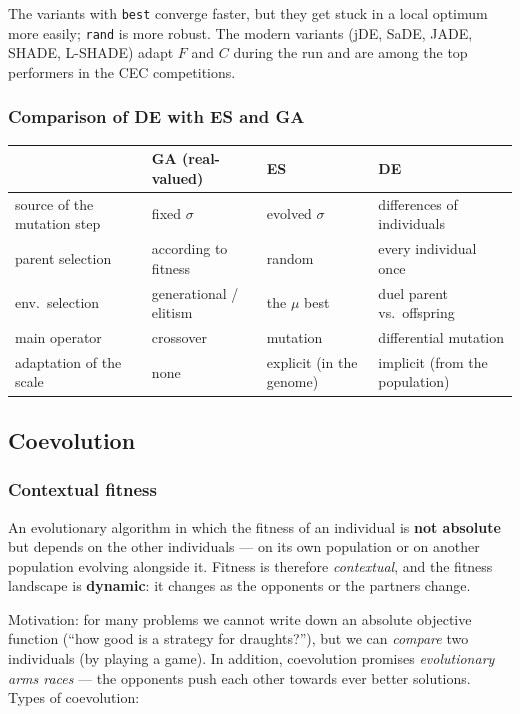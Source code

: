 \documentclass[11pt,a4paper]{article}
\theoremstyle{definition}
\providecommand{\uv}[1]{``#1''}
\begin{document}
The variants with \texttt{best} converge faster, but they get stuck in a local
optimum more easily; \texttt{rand} is more robust. The modern variants (jDE,
SaDE, JADE, SHADE, L-SHADE) adapt $F$ and $C$ during the run and are among the
top performers in the CEC competitions.

\subsubsection{Comparison of DE with ES and GA}

\begin{center}
\begin{tabular}{@{}p{3.2cm}p{3.7cm}p{3.7cm}p{3.7cm}@{}}
\toprule
 & \textbf{GA (real-valued)} & \textbf{ES} & \textbf{DE} \\
\midrule
source of the mutation step & fixed $\sigma$ & evolved $\sigma$ & differences of
  individuals \\
parent selection & according to fitness & random & every individual once \\
env.\ selection & generational / elitism & the $\mu$ best & duel parent vs.\
  offspring \\
main operator & crossover & mutation & differential mutation \\
adaptation of the scale & none & explicit (in the genome) & implicit (from the
  population) \\
\bottomrule
\end{tabular}
\end{center}

\subsection{Coevolution}
\label{sec:koevoluce}
\subsubsection{Contextual fitness}

\begin{defbox}[Coevolution]
An evolutionary algorithm in which the fitness of an individual is \textbf{not
absolute} but depends on the other individuals --- on its own population or on
another population evolving alongside it. Fitness is therefore
\emph{contextual}, and the fitness landscape is \textbf{dynamic}: it changes as
the opponents or the partners change.
\end{defbox}

Motivation: for many problems we cannot write down an absolute objective
function (\uv{how good is a strategy for draughts?}), but we can \emph{compare}
two individuals (by playing a game). In addition, coevolution promises
\emph{evolutionary arms races} --- the opponents push each other towards ever
better solutions. Types of coevolution:
\end{document}
